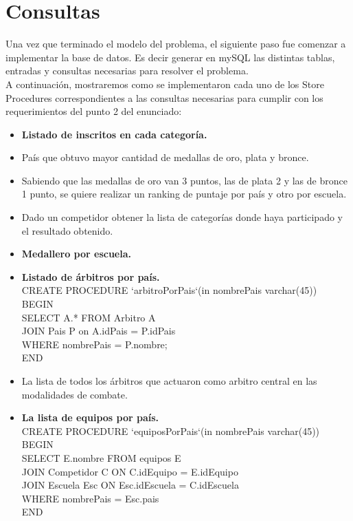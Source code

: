 \section{Consultas}
Una vez que terminado el modelo del problema, el siguiente paso fue comenzar a implementar la base de datos. Es decir generar en mySQL las distintas tablas, entradas y consultas necesarias para resolver el problema.\\

A continuación, mostraremos como se implementaron cada uno de los Store Procedures correspondientes a las consultas necesarias para cumplir con los requerimientos del punto 2 del enunciado:\\

\begin{itemize}
\item{ \textbf{Listado de inscritos en cada categoría.}\\
}

\item País que obtuvo mayor cantidad de medallas de oro, plata y bronce.
\item Sabiendo que las medallas de oro van 3 puntos, las de plata 2 y las de bronce 1 punto, se quiere realizar un ranking de puntaje por país y otro por escuela.
\item Dado un competidor obtener la lista de categorías donde haya participado y el resultado obtenido.

\item{ \textbf{Medallero por escuela.}\\
}
\item{\textbf{Listado de árbitros por país.}\\
CREATE PROCEDURE `arbitroPorPais`(in nombrePais varchar(45))\\
BEGIN\\
SELECT A.* FROM Arbitro A\\
	JOIN Pais P on A.idPais = P.idPais\\
    WHERE nombrePais = P.nombre;\\
END\\
}
\item La lista de todos los árbitros que actuaron como arbitro central en las modalidades de combate.

\item{\textbf{La lista de equipos por país.}\\
CREATE PROCEDURE `equiposPorPais`(in nombrePais varchar(45))\\
BEGIN\\
SELECT E.nombre FROM equipos E\\
	JOIN Competidor C ON C.idEquipo = E.idEquipo\\
	JOIN Escuela Esc ON Esc.idEscuela = C.idEscuela\\
	WHERE nombrePais = Esc.pais\\
END\\
}
\end{itemize}

